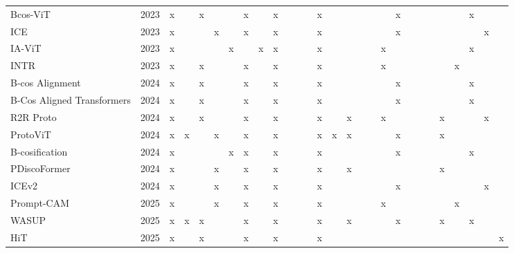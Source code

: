 \begin{tabular}{ll|cc|ccc|cc|cccc|ccccc|ccccc|ccccc}
\addlinespace
Bcos-ViT \cite{bohleHolisticallyExplainableVision2023} & 2023 & x &  & x &  &  & x &  & x &  &  &  & x &  &  &  &  &  & x &  &  &  &  &  & x &  &  \\
ICE \cite{choiAdversarialNormalizationCan2023} & 2023 & x &  &  & x &  & x &  & x &  &  &  & x &  &  &  &  &  & x &  &  &  &  &  &  & x &  \\
IA-ViT \cite{qiangInterpretabilityAwareVisionTransformer2023} & 2023 & x &  &  &  & x &  & x & x &  &  &  & x &  &  &  &  & x &  &  &  &  &  &  & x &  &  \\
INTR \cite{paulSimpleInterpretableTransformer2024} & 2023 & x &  & x &  &  & x &  & x &  &  &  & x &  &  &  &  & x &  &  &  &  &  & x &  &  &  \\
\addlinespace
B-cos Alignment \cite{bohleBcosAlignmentInherently2024} & 2024 & x &  & x &  &  & x &  & x &  &  &  & x &  &  &  &  &  & x &  &  &  &  &  & x &  &  \\
B-Cos Aligned Transformers \cite{tranBCosAlignedTransformers2024} & 2024 & x &  & x &  &  & x &  & x &  &  &  & x &  &  &  &  &  & x &  &  &  &  &  & x &  &  \\
R2R Proto \cite{demirExplainableTransformerPrototypes2024} & 2024 & x &  & x &  &  & x &  & x &  &  &  & x &  & x &  &  & x &  &  &  &  & x &  &  & x &  \\
ProtoViT \cite{maInterpretableImageClassification2024} & 2024 & x & x &  & x &  & x &  & x &  &  &  & x & x & x &  &  &  & x &  &  &  & x &  &  &  &  \\
B-cosification \cite{aryaBcosificationTransformingDeep2024} & 2024 & x &  &  &  & x & x &  & x &  &  &  & x &  &  &  &  &  & x &  &  &  &  &  & x &  &  \\
PDiscoFormer \cite{anirajPDiscoFormerRelaxingPart2025} & 2024 & x &  &  & x &  & x &  & x &  &  &  & x &  & x &  &  &  &  &  &  &  & x &  &  &  &  \\
ICEv2 \cite{choiICEv2InterpretabilityComprehensiveness2025} & 2024 & x &  &  & x &  & x &  & x &  &  &  & x &  &  &  &  &  & x &  &  &  &  &  &  & x &  \\
\addlinespace
Prompt-CAM \cite{chowdhuryPromptCAMMakingVision2025} & 2025 & x &  &  & x &  & x &  & x &  &  &  & x &  &  &  &  & x &  &  &  &  &  & x &  &  &  \\
WASUP \cite{wolfWASUPInterpretableClassification2025} & 2025 & x & x & x &  &  & x &  & x &  &  &  & x &  & x &  &  &  & x &  &  &  & x &  & x &  &  \\
HiT \cite{jeanneretDisentanglingVisualTransformers2025} & 2025 & x &  & x &  &  & x &  & x &  &  &  & x &  &  &  &  &  &  &  &  &  &  &  &  &  & x \\

\end{tabular}
